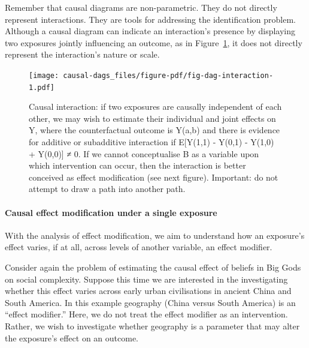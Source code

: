 \documentclass[
  singlecolumn]{article}
\let\oldparagraph\paragraph
\renewcommand{\paragraph}[1]{\oldparagraph{#1}\mbox{}}
\begin{document}
Remember that causal diagrams are non-parametric. They do not directly
represent interactions. They are tools for addressing the identification
problem. Although a causal diagram can indicate an interaction's
presence by displaying two exposures jointly influencing an outcome, as
in Figure~\ref{fig-dag-interaction}, it does not directly represent the
interaction's nature or scale.

\begin{figure}

{\centering \texttt{[image: causal-dags\_files/figure-pdf/fig-dag-interaction-1.pdf]}

}

\caption{\label{fig-dag-interaction}Causal interaction: if two exposures
are causally independent of each other, we may wish to estimate their
individual and joint effects on Y, where the counterfactual outcome is
Y(a,b) and there is evidence for additive or subadditive interaction if
E{[}Y(1,1) - Y(0,1) - Y(1,0) + Y(0,0){]} ≠ 0. If we cannot conceptualise
B as a variable upon which intervention can occur, then the interaction
is better conceived as effect modification (see next figure). Important:
do not attempt to draw a path into another path.}

\end{figure}

\hypertarget{causal-effect-modification-under-a-single-exposure}{%
\paragraph{\texorpdfstring{\textbf{Causal effect modification under a
single
exposure}}{Causal effect modification under a single exposure}}\label{causal-effect-modification-under-a-single-exposure}}

With the analysis of effect modification, we aim to understand how an
exposure's effect varies, if at all, across levels of another variable,
an effect modifier.

Consider again the problem of estimating the causal effect of beliefs in
Big Gods on social complexity. Suppose this time we are interested in
the investigating whether this effect varies across early urban
civilisations in ancient China and South America. In this example
geography (China versus South America) is an ``effect modifier.'' Here,
we do not treat the effect modifier as an intervention. Rather, we wish
to investigate whether geography is a parameter that may alter the
exposure's effect on an outcome.
\end{document}
